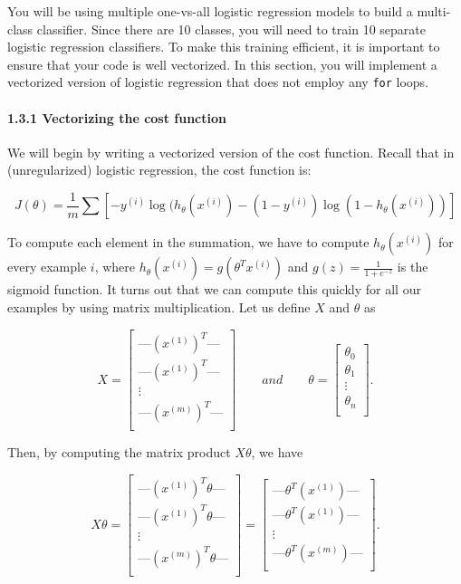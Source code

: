 \documentclass[11pt]{article}
\begin{document}
You will be using multiple one-vs-all logistic regression models to
build a multi-class classifier. Since there are 10 classes, you will
need to train 10 separate logistic regression classifiers. To make this
training efficient, it is important to ensure that your code is well
vectorized. In this section, you will implement a vectorized version of
logistic regression that does not employ any \texttt{for} loops.

\paragraph{1.3.1 Vectorizing the cost
function}\label{vectorizing-the-cost-function}

We will begin by writing a vectorized version of the cost function.
Recall that in (unregularized) logistic regression, the cost function
is:

\[J(\theta) = \frac{1}{m}\sum[-y^{(i)}\log(h_\theta(x^{(i)})-(1-y^{(i)})\log(1-h_\theta(x^{(i)}))]\]

To compute each element in the summation, we have to compute
\(h_\theta(x^{(i)})\) for every example \(i\), where
\(h_\theta(x^{(i)})= g(\theta^Tx^{(i)})\) and
\(g(z)=\frac{1}{1+e^{-z}}\) is the sigmoid function. It turns out that
we can compute this quickly for all our examples by using matrix
multiplication. Let us define \(X\) and \(\theta\) as

\[
X=\left[ \begin{array}{cccc}
—(x^{(1)})^T—  \\
—(x^{(1)})^T—   \\
 \vdots      \\
—(x^{(m)})^T—   \\
 \end{array} \right]
\qquad and \qquad 
\theta = \left[\begin{array}{cccc}
\theta_0 \\
\theta_1 \\
\vdots \\
\theta_n \\
\end{array} \right].
\]

Then, by computing the matrix product \(X\theta\), we have

\[
X  \theta = \left[ \begin{array}{cccc}
—(x^{(1)})^T\theta —  \\
—(x^{(1)})^T\theta —   \\
 \vdots      \\
—(x^{(m)})^T\theta —   \\
 \end{array} \right]
= \left[ \begin{array}{cccc}
—\theta^T(x^{(1)})—  \\
—\theta^T(x^{(1)})—   \\
 \vdots      \\
—\theta^T(x^{(m)})—   \\
 \end{array} \right].
\]
\end{document}
